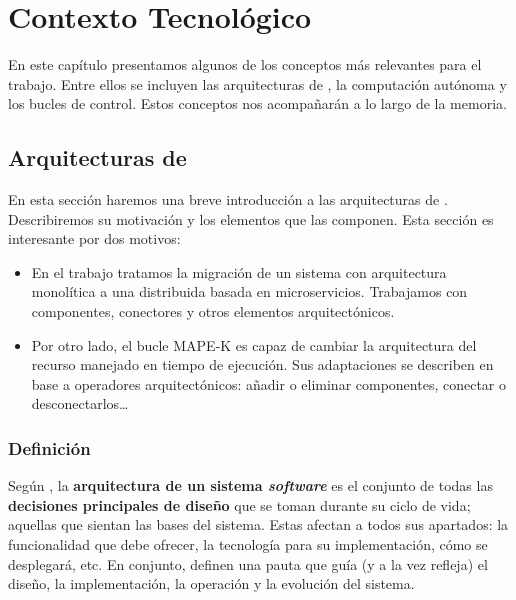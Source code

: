 \chapter{Contexto Tecnológico}
\label{chap:contexto_tecnologico}

En este capítulo presentamos algunos de los conceptos más relevantes para el trabajo. Entre ellos se incluyen las arquitecturas de , la computación autónoma y los bucles de control. Estos conceptos nos acompañarán a lo largo de la memoria.

\section{Arquitecturas de }

En esta sección haremos una breve introducción a las arquitecturas de . Describiremos su motivación y los elementos que las componen. Esta sección es interesante por dos motivos:

\begin{itemize}
  \item En el trabajo tratamos la migración de un sistema con arquitectura monolítica a una distribuida basada en microservicios. Trabajamos con componentes, conectores y otros elementos arquitectónicos.

  \item Por otro lado, el bucle MAPE-K es capaz de cambiar la arquitectura del recurso manejado en tiempo de ejecución. Sus adaptaciones se describen en base a operadores arquitectónicos: añadir o eliminar componentes, conectar o desconectarlos\dots
\end{itemize}

\subsection{Definición}

Según \cite{taylorSoftwareArchitectureFoundations2009}, la \textbf{arquitectura de un sistema \emph{software}} es el conjunto de todas las \textbf{decisiones principales de diseño} que se toman durante su ciclo de vida; aquellas que sientan las bases del sistema. Estas afectan a todos sus apartados: la funcionalidad que debe ofrecer, la tecnología para su implementación, cómo se desplegará, etc. En conjunto, definen una pauta que guía (y a la vez refleja) el diseño, la implementación, la operación y la evolución del sistema.

